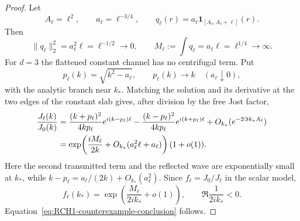 \documentclass[11pt]{article}
\theoremstyle{definition}
\theoremstyle{remark}
\begin{document}
\begin{proof}
Let
\begin{equation}
 A_\ell=\ell^2,
 \qquad
 a_\ell=\ell^{-3/4},
 \qquad
 q_\ell(r)=a_\ell\mathbf1_{[A_\ell,A_\ell+\ell]}(r).
 \label{eq:RCH1-slab}
\end{equation}
Then
\begin{equation}
 \|q_\ell\|_2^2=a_\ell^2\ell=\ell^{-1/2}\longrightarrow0,
 \qquad
 M_\ell:=\int q_\ell=a_\ell\ell=\ell^{1/4}\longrightarrow\infty.
 \label{eq:RCH1-mass-cost}
\end{equation}
For $d=3$ the flattened constant channel has no centrifugal term.  Put
\begin{equation}
 p_\ell(k)=\sqrt{k^2-a_\ell},
 \qquad p_\ell(k)\longrightarrow k
 \quad(a_\ell\downarrow0),
 \label{eq:slab-momentum}
\end{equation}
with the analytic branch near $k_*$.  Matching the solution and its derivative at the two edges of the constant slab gives, after division by the free Jost factor,
\begin{align}
 \frac{J_\ell(k)}{J_0(k)}
 &=\frac{(k+p_\ell)^2}{4kp_\ell}
   e^{i(k-p_\ell)\ell}
   -\frac{(k-p_\ell)^2}{4kp_\ell}
   e^{i(k+p_\ell)\ell}
   +O_{k_*}(e^{-2\Im k_*A_\ell})\notag\\
 &=\exp\!\left(\frac{iM_\ell}{2k}
       +O_{k_*}(a_\ell^2\ell+a_\ell)\right)(1+o(1)).
 \label{eq:slab-transfer}
\end{align}
Here the second transmitted term and the reflected wave are exponentially small at $k_*$, while
$k-p_\ell=a_\ell/(2k)+O_{k_*}(a_\ell^2)$.  Since
$f_\ell=J_0/J_\ell$ in the scalar model,
\begin{equation}
 f_\ell(k_*)
 =\exp\!\left(\frac{M_\ell}{2ik_*}+o(1)\right),
 \qquad
 \Re\frac1{2ik_*}<0.
 \label{eq:slab-f-decay}
\end{equation}
Equation~\eqref{eq:RCH1-counterexample-conclusion} follows.
\end{proof}
\end{document}
